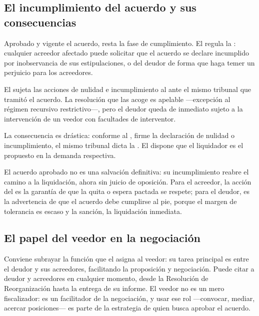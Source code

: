 \subsection{El incumplimiento del acuerdo y sus consecuencias}

Aprobado y vigente el acuerdo, resta la fase de cumplimiento. El  regula la
: cualquier acreedor afectado puede solicitar que el acuerdo
se declare incumplido por inobservancia de sus estipulaciones, o  del deudor de forma que haga temer un perjuicio para los acreedores.

El  sujeta las acciones de nulidad e incumplimiento al  ante el
mismo tribunal que tramitó el acuerdo. La resolución que las acoge es apelable  ---excepción al régimen recursivo restrictivo---, pero el deudor queda de inmediato
sujeto a la intervención de un veedor con facultades de interventor.

La consecuencia es drástica: conforme al , firme la declaración de nulidad o
incumplimiento, el mismo tribunal dicta la . El  dispone que el liquidador es el propuesto en la demanda respectiva.

\begin{foco}
El acuerdo aprobado no es una salvación definitiva: su incumplimiento reabre el camino a la
liquidación, ahora sin juicio de oposición. Para el acreedor, la acción del  es la
garantía de que la quita o espera pactada se respete; para el deudor, es la advertencia de que
el acuerdo debe cumplirse al pie, porque el margen de tolerancia es escaso y la sanción, la
liquidación inmediata.
\end{foco}

\subsection{El papel del veedor en la negociación}

Conviene subrayar la función que el  asigna al veedor: su tarea principal es
 entre el deudor y sus acreedores, facilitando la proposición y
negociación. Puede citar a deudor y acreedores en cualquier momento, desde la Resolución de
Reorganización hasta la entrega de su informe. El veedor no es un mero fiscalizador: es un
facilitador de la negociación, y usar ese rol ---convocar, mediar, acercar posiciones--- es parte
de la estrategia de quien busca aprobar el acuerdo.

